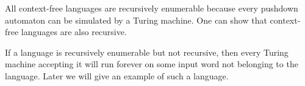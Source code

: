 

\setcounter{section}{8}
\setcounter{subsection}{1}
\setcounter{dfn}{3}

All context-free languages are recursively enumerable because every pushdown automaton can be simulated by a Turing machine.
One can show that context-free languages are also recursive.

If a language is recursively enumerable but not recursive,
then every Turing machine accepting it will run forever on some input word not belonging to the language.
Later we will give an example of such a language.


